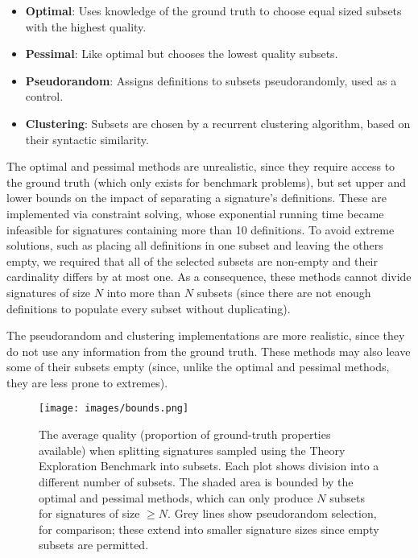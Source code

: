 \begin{itemize}
\item \textbf{Optimal}: Uses knowledge of the ground truth to choose equal sized
  subsets with the highest quality.
\item \textbf{Pessimal}: Like optimal but chooses the lowest quality subsets.
\item \textbf{Pseudorandom}: Assigns definitions to subsets pseudorandomly, used
  as a control.
\item \textbf{Clustering}: Subsets are chosen by a recurrent clustering
  algorithm, based on their syntactic similarity.
\end{itemize}

The optimal and pessimal methods are unrealistic, since they require access to
the ground truth (which only exists for benchmark problems), but set upper and
lower bounds on the impact of separating a signature's definitions. These are
implemented via constraint solving, whose exponential running time became
infeasible for signatures containing more than 10 definitions. To avoid extreme
solutions, such as placing all definitions in one subset and leaving the others
empty, we required that all of the selected subsets are non-empty and their
cardinality differs by at most one. As a consequence, these methods cannot
divide signatures of size $N$ into more than $N$ subsets (since there are not
enough definitions to populate every subset without duplicating).

The pseudorandom and clustering implementations are more realistic, since they
do not use any information from the ground truth. These methods may also leave
some of their subsets empty (since, unlike the optimal and pessimal methods,
they are less prone to extremes).

\begin{figure}
  \texttt{[image: images/bounds.png]}
  \caption{The average quality (proportion of ground-truth properties available)
    when splitting signatures sampled using the Theory Exploration Benchmark
    into subsets. Each plot shows division into a different number of subsets.
    The shaded area is bounded by the optimal and pessimal methods, which can
    only produce $N$ subsets for signatures of size $\geq N$. Grey lines show
    pseudorandom selection, for comparison; these extend into smaller signature
    sizes since empty subsets are permitted.}
  \label{fig:bounds}
\end{figure}

